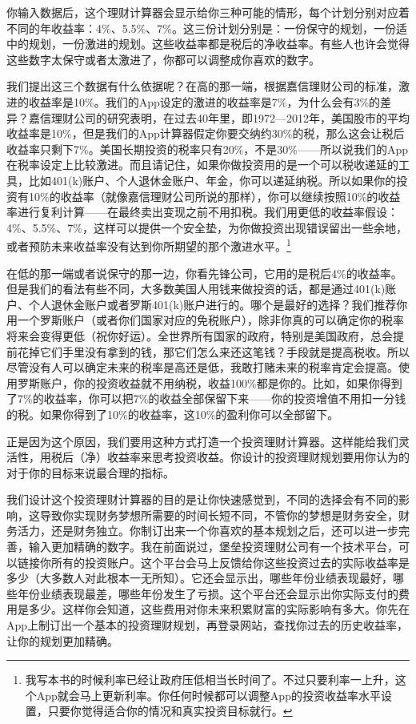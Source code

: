 你输入数据后，这个理财计算器会显示给你三种可能的情形，每个计划分别对应着不同的年收益率：4\%、5.5\%、7\%。这三份计划分别是：一份保守的规划，一份适中的规划，一份激进的规划。这些收益率都是税后的净收益率。有些人也许会觉得这些数字太保守或者太激进了，你都可以调整成你喜欢的数字。

我们提出这三个数据有什么依据呢？在高的那一端，根据嘉信理财公司的标准，激进的收益率是10\%。我们的App设定的激进的收益率是7\%，为什么会有3\%的差异？嘉信理财公司的研究表明，在过去40年里，即1972—2012年，美国股市的平均收益率是10\%，但是我们的App计算器假定你要交纳约30\%的税，那么这会让税后收益率只剩下7\%。美国长期投资的税率只有20\%，不是30\%——所以说我们的App在税率设定上比较激进。而且请记住，如果你做投资用的是一个可以税收递延的工具，比如401(k)账户、个人退休金账户、年金，你可以递延纳税。所以如果你的投资有10\%的收益率（就像嘉信理财公司所说的那样），你可以继续按照10\%的收益率进行复利计算——在最终卖出变现之前不用扣税。我们用更低的收益率假设：4\%、5.5\%、7\%，这样可以提供一个安全垫，为你做投资出现错误留出一些余地，或者预防未来收益率没有达到你所期望的那个激进水平。\footnote{\label{fn:pdf-16-1}我写本书的时候利率已经让政府压低相当长时间了。不过只要利率一上升，这个App就会马上更新利率。你任何时候都可以调整App的投资收益率水平设置，只要你觉得适合你的情况和真实投资目标就行。}

在低的那一端或者说保守的那一边，你看先锋公司，它用的是税后4\%的收益率。但是我们的看法有些不同，大多数美国人用钱来做投资的话，都是通过401(k)账户、个人退休金账户或者罗斯401(k)账户进行的。哪个是最好的选择？我们推荐你用一个罗斯账户（或者你们国家对应的免税账户），除非你真的可以确定你的税率将来会变得更低（祝你好运）。全世界所有国家的政府，特别是美国政府，总会提前花掉它们手里没有拿到的钱，那它们怎么来还这笔钱？手段就是提高税收。所以尽管没有人可以确定未来的税率是高还是低，我敢打赌未来的税率肯定会提高。使用罗斯账户，你的投资收益就不用纳税，收益100\%都是你的。比如，如果你得到了7\%的收益率，你可以把7\%的收益全部保留下来——你的投资增值不用扣一分钱的税。如果你得到了10\%的收益率，这10\%的盈利你可以全部留下。

正是因为这个原因，我们要用这种方式打造一个投资理财计算器。这样能给我们灵活性，用税后（净）收益率来思考投资收益。你设计的投资理财规划要用你认为的对于你的目标来说最合理的指标。

我们设计这个投资理财计算器的目的是让你快速感觉到，不同的选择会有不同的影响，这导致你实现财务梦想所需要的时间长短不同，不管你的梦想是财务安全，财务活力，还是财务独立。你制订出来一个你喜欢的基本规划之后，还可以进一步完善，输入更加精确的数字。我在前面说过，堡垒投资理财公司有一个技术平台，可以链接你所有的投资账户。这个平台会马上反馈给你这些投资过去的实际收益率是多少（大多数人对此根本一无所知）。它还会显示出，哪些年份业绩表现最好，哪些年份业绩表现最差，哪些年份发生了亏损。这个平台还会显示出你实际支付的费用是多少。这样你会知道，这些费用对你未来积累财富的实际影响有多大。你先在App上制订出一个基本的投资理财规划，再登录网站，查找你过去的历史收益率，让你的规划更加精确。

